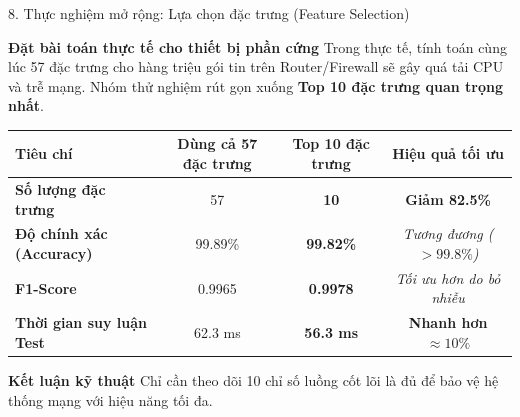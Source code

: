 \documentclass[lualatex,10pt,unknownkeysallowed]{beamer}
\begin{document}
\begin{frame}{8. Thực nghiệm mở rộng: Lựa chọn đặc trưng (Feature Selection)}
  \begin{block}{\textbf{Đặt bài toán thực tế cho thiết bị phần cứng}}
    Trong thực tế, tính toán cùng lúc 57 đặc trưng cho hàng triệu gói tin trên Router/Firewall sẽ gây quá tải CPU và trễ mạng. Nhóm thử nghiệm rút gọn xuống \textbf{Top 10 đặc trưng quan trọng nhất}.
  \end{block}

  \vspace{0.2cm}
  \begin{table}[h]
    \centering
    \small
    \begin{tabular}{lccc}
      \toprule
      \textbf{Tiêu chí} & \textbf{Dùng cả 57 đặc trưng} & \textbf{Top 10 đặc trưng} & \textbf{Hiệu quả tối ưu} \\
      \midrule
      \textbf{Số lượng đặc trưng} & 57 & \textbf{10} & \textbf{Giảm 82.5\%} \\
      \textbf{Độ chính xác (Accuracy)} & 99.89\% & \textbf{99.82\%} & \textit{Tương đương ($>99.8\%$)} \\
      \textbf{F1-Score} & 0.9965 & \textbf{0.9978} & \textit{Tối ưu hơn do bỏ nhiễu} \\
      \textbf{Thời gian suy luận Test} & 62.3 ms & \textbf{56.3 ms} & \textbf{Nhanh hơn $\approx 10\%$} \\
      \bottomrule
    \end{tabular}
  \end{table}

  \begin{exampleblock}{\textbf{Kết luận kỹ thuật}}
    Chỉ cần theo dõi 10 chỉ số luồng cốt lõi là đủ để bảo vệ hệ thống mạng với hiệu năng tối đa.
  \end{exampleblock}
\end{frame}
\end{document}
